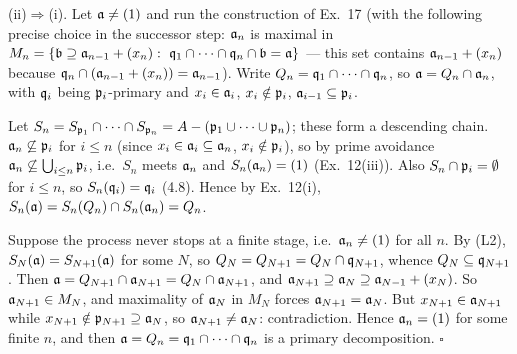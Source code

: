 \documentclass[11pt]{article}
\begin{document}
(ii)$\Rightarrow$(i). Let $\mathfrak a\ne(1)$ and run the construction of Ex.~17 (with the following precise choice in the successor step: $\mathfrak a_n$ is maximal in $M_n=\{\fb\supseteq\fa_{n-1}+(x_n):\ \fq_1\cap\dots\cap\fq_n\cap\fb=\fa\}$ --- this set contains $\mathfrak a_{n-1}+(x_n)$ because $\mathfrak q_n\cap(\mathfrak a_{n-1}+(x_n))=\mathfrak a_{n-1}$). Write $Q_n=\mathfrak q_1\cap\dots\cap\mathfrak q_n$, so $\mathfrak a=Q_n\cap\mathfrak a_n$, with $\mathfrak q_i$ being $\mathfrak p_i$-primary and $x_i\in\mathfrak a_i$, $x_i\notin\mathfrak p_i$, $\mathfrak a_{i-1}\subseteq\mathfrak p_i$.

Let $S_n=S_{\mathfrak p_1}\cap\dots\cap S_{\mathfrak p_n}=A-(\mathfrak p_1\cup\dots\cup\mathfrak p_n)$; these form a descending chain. $\mathfrak a_n\not\subseteq\mathfrak p_i$ for $i\le n$ (since $x_i\in\mathfrak a_i\subseteq\mathfrak a_n$, $x_i\notin\mathfrak p_i$), so by prime avoidance $\mathfrak a_n\not\subseteq\bigcup_{i\le n}\mathfrak p_i$, i.e.\ $S_n$ meets $\mathfrak a_n$ and $S_n(\mathfrak a_n)=(1)$ (Ex.~12(iii)). Also $S_n\cap\mathfrak p_i=\emptyset$ for $i\le n$, so $S_n(\mathfrak q_i)=\mathfrak q_i$ (4.8). Hence by Ex.~12(i), $S_n(\mathfrak a)=S_n(Q_n)\cap S_n(\mathfrak a_n)=Q_n$.

Suppose the process never stops at a finite stage, i.e.\ $\mathfrak a_n\ne(1)$ for all $n$. By (L2), $S_N(\mathfrak a)=S_{N+1}(\mathfrak a)$ for some $N$, so $Q_N=Q_{N+1}=Q_N\cap\mathfrak q_{N+1}$, whence $Q_N\subseteq\mathfrak q_{N+1}$. Then $\mathfrak a=Q_{N+1}\cap\mathfrak a_{N+1}=Q_N\cap\mathfrak a_{N+1}$, and $\mathfrak a_{N+1}\supseteq\mathfrak a_N\supseteq\mathfrak a_{N-1}+(x_N)$. So $\mathfrak a_{N+1}\in M_N$, and maximality of $\mathfrak a_N$ in $M_N$ forces $\mathfrak a_{N+1}=\mathfrak a_N$. But $x_{N+1}\in\mathfrak a_{N+1}$ while $x_{N+1}\notin\mathfrak p_{N+1}\supseteq\mathfrak a_N$, so $\mathfrak a_{N+1}\ne\mathfrak a_N$: contradiction. Hence $\mathfrak a_n=(1)$ for some finite $n$, and then $\mathfrak a=Q_n=\mathfrak q_1\cap\dots\cap\mathfrak q_n$ is a primary decomposition. \hfill$\square$
\end{document}
